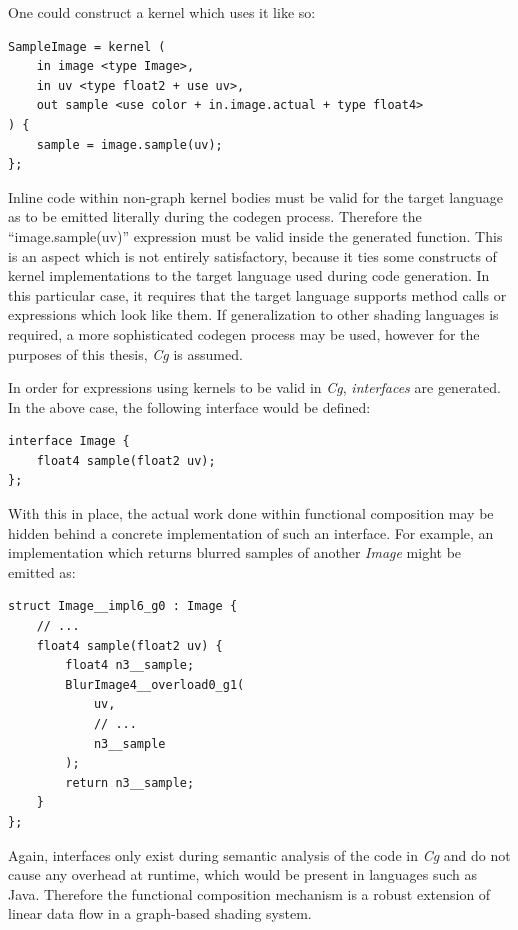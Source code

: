 One could construct a kernel which uses it like so:

\noindent\begin{minipage}{\textwidth}
\begin{lstlisting}[frame=single]
SampleImage = kernel (
	in image <type Image>,
	in uv <type float2 + use uv>,
	out sample <use color + in.image.actual + type float4>
) {
	sample = image.sample(uv);
};
\end{lstlisting}
\end{minipage}

Inline code within non-graph kernel bodies must be valid for the target language as to be emitted literally during the codegen process. Therefore the ``image.sample(uv)'' expression must be valid inside the generated function. This is an aspect which is not entirely satisfactory, because it ties some constructs of kernel implementations to the target language used during code generation. In this particular case, it requires that the target language supports method calls or expressions which look like them. If generalization to other shading languages is required, a more sophisticated codegen process may be used, however for the purposes of this thesis, \emph{Cg} is assumed.

In order for expressions using kernels to be valid in \emph{Cg}, \emph{interfaces} are generated. In the above case, the following interface would be defined:

\noindent\begin{minipage}{\textwidth}
\begin{lstlisting}[frame=single]
interface Image {
	float4 sample(float2 uv);
};
\end{lstlisting}
\end{minipage}

With this in place, the actual work done within functional composition may be hidden behind a concrete implementation of such an interface. For example, an implementation which returns blurred samples of another \emph{Image} might be emitted as:

\noindent\begin{minipage}{\textwidth}
\begin{lstlisting}[frame=single]
struct Image__impl6_g0 : Image {
	// ...
	float4 sample(float2 uv) {
		float4 n3__sample;
		BlurImage4__overload0_g1(
			uv,
			// ...
			n3__sample
		);
		return n3__sample;
	}
};
\end{lstlisting}
\end{minipage}

Again, interfaces only exist during semantic analysis of the code in \emph{Cg} and do not cause any overhead at runtime, which would be present in languages such as Java. Therefore the functional composition mechanism is a robust extension of linear data flow in a graph-based shading system.
